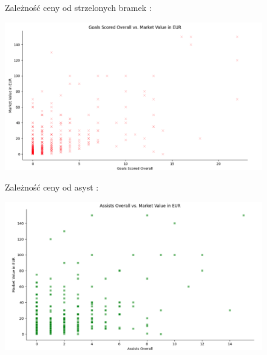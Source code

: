 \documentclass{article}
\begin{document}
\begin{figure}[H]
    \centering
        \begin{minipage}{0.5\textwidth} 
        \centering Zależność ceny od strzelonych bramek :
    \end{minipage}
    \begin{minipage}{1\textwidth} 
        \includegraphics[width=\linewidth]{goals.png} 
        \label{fig:zdjecie}
    \end{minipage}
    \hfill 
\end{figure}


\begin{figure}[H]
    \centering
        \begin{minipage}{0.5\textwidth} 
        \centering Zależność ceny od asyst :
    \end{minipage}
    \begin{minipage}{1\textwidth} 
        \includegraphics[width=\linewidth]{assists.png} 
        \label{fig:zdjecie}
    \end{minipage}
    \hfill 

\end{figure}
\end{document}
